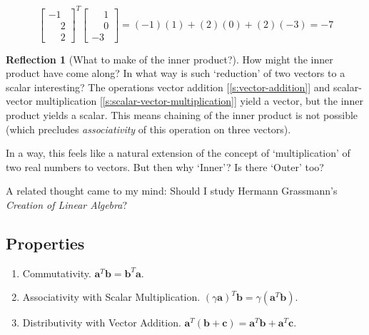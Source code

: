 \documentclass[11pt]{book}
\theoremstyle{definition}
\theoremstyle{plain}
\theoremstyle{problemstyle}
\theoremstyle{remark}
\theoremstyle{definition}
\newtheorem{reflection}{Reflection}
\begin{document}
    \begin{equation*}
        \label{eq:inner-product-ex}
    \begin{bmatrix}
        -1\\
        \phantom{-}2\\
        \phantom{-}2
    \end{bmatrix}^T
    \begin{bmatrix}
        \phantom{-}1\\
        \phantom{-}0\\
        -3
    \end{bmatrix}
        =(-1)(1)+(2)(0)+(2)(-3)=-7
    \end{equation*}

\begin{reflection}[What to make of the inner product?]
    How might the inner product have come along? In what way is such `reduction' of two vectors to a scalar interesting? The operations vector addition [\ref{s:vector-addition}] and scalar-vector multiplication [\ref{s:scalar-vector-multiplication}] yield a vector, but the inner product yields a scalar. This means chaining of the inner product is not possible (which precludes \emph{associativity} of this operation on three vectors).

    In a way, this feels like a natural extension of the concept of `multiplication' of two real numbers to vectors. But then why `Inner'? Is there `Outer' too?

    A related thought came to my mind: Should I study Hermann Grassmann's \emph{Creation of Linear Algebra}? 
\end{reflection}

\subsection*{Properties}
\label{ss:properties-inner-product}
\begin{enumerate}
    \item Commutativity. $\boldsymbol{a}^T\boldsymbol{b}=\boldsymbol{b}^T\boldsymbol{a}$.
    \item Associativity with Scalar Multiplication. $(\gamma\boldsymbol{a})^T\boldsymbol{b}=\gamma(\boldsymbol{a}^T\boldsymbol{b})$.
    \item Distributivity with Vector Addition. $\boldsymbol{a}^T(\boldsymbol{b}+\boldsymbol{c})=\boldsymbol{a}^T\boldsymbol{b}+\boldsymbol{a}^T\boldsymbol{c}$.
\end{enumerate}
\end{document}
